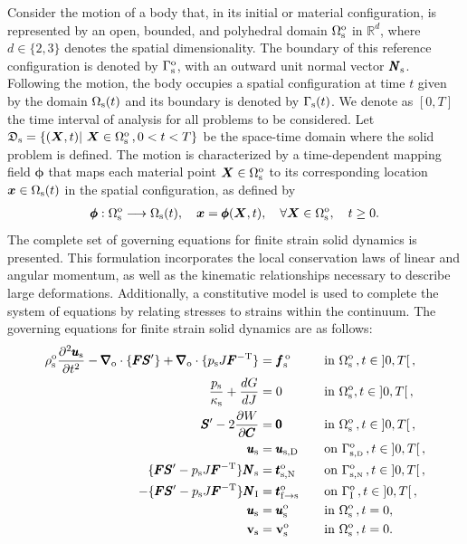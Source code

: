 \documentclass[11pt,english]{article}
\def\usolid{\pmb{u}_{\rm{s}}}                   %
\def\psolid{p_{\rm{s}}}                         %
\def\devPK{\pmb{S}^\prime}                      %
\def\X{\pmb{X}}                             %
\def\x{\pmb{x}}                             %
\def\motion{\pmb{\phi}}                     %
\def\F{\pmb{F}}                             %
\def\C{\pmb{C}}                             %
\def\invFtrans{\pmb{F}^{-\rm{T}}}           %
\def\dGdJ{\frac{dG}{dJ}}                    %
\def\dWdC{\frac{\partial W}{\partial \C}}   %
\def\vsolid{\vb{v}_{\rm{s}}}               %
\def\domainsolidreference{\Omega_{\rm{s}}^{\rm{o}}}  %
\def\domainsolid{\Omega_{\rm{s}}}                    %
\def\boundarysolid{\Gamma_{\rm{s}}}         %
\def\boundarysolidreference{\Gamma_{\rm{s}}^{\rm{o}}}         %
\def\boundarysolidDirichlet{\Gamma_{\rm{s,\scriptscriptstyle \rm{D}}}^{\rm{o}}} %
\def\boundarysolidNeumann{\Gamma_{\rm{s}, \scriptscriptstyle \rm{N}}^{\rm{o}}} %
\def\spacetimesoliddomain{\mathfrak{D}_{\rm{s}}}     %
\def\Normal{\pmb{N}_{\rm{s}}}                       %
\def\usolidDir{\pmb{u}_{\rm{s},\rm{D}}}                    %
\def\reftract{\pmb{t}_{\rm{s},\rm{N}}^{\rm{o}}}            %
\def\bodyfsolid{\pmb{f}_{\rm{s}}^{\,\rm{o}}}        %
\def\grad{\pmb{\nabla}_{\rm{o}}}        %
\def\div{\grad \cdot}                   %
\def\denssolid{\rho_{\rm{s}}^{\rm{o}}}  %
\def\kappasolid{\kappa_{\rm{s}}}        %
\def\X{\boldsymbol{X}}
\def\x{\boldsymbol{x}}
\def\boundaryFSIreference{\Gamma_{\rm{I}}^{\rm{o}}}
\def\FSItract{\pmb{t}_{\rm{f}\to{\rm{s}}}}
\def\FSItractref{\FSItract^{\rm{o}}}
\def\NormalFSI{\pmb{N}_{\rm{I}}}
\def\timeint{\left ] 0,T\right[}                         %
\def\dudt{\frac{\partial \usolid}{\partial t}}          %
\def\dudt2{\frac{\partial^2 \usolid}{\partial t^2}}     %
\begin{document}
Consider the motion of a body that, in its initial or material configuration, is represented by an open, bounded, and polyhedral domain \(\domainsolidreference\) in \(\mathbb{R}^d\), where \(d \in \lbrace 2, 3 \rbrace\) denotes the spatial dimensionality. The boundary of this reference configuration is denoted by \(\boundarysolidreference\), with an outward unit normal vector \(\Normal\). Following the motion, the body occupies a spatial configuration at time $t$ given by the domain \(\domainsolid (t)\) and its boundary is denoted by \(\boundarysolid (t) \). We denote as $[0,T]$ the time interval of analysis for all problems to be considered. Let $\spacetimesoliddomain=\left \lbrace (\X,t) \rvert ~\X \in \domainsolidreference\,, 0<t<T \right \rbrace$ be the space-time domain where the solid problem is defined. The motion is characterized by a time-dependent mapping field \(\motion\) that maps each material point \(\X \in \domainsolidreference\) to its corresponding location \(\x \in \domainsolid (t)\) in the spatial configuration, as defined by
 \begin{align*}
     \motion : \domainsolidreference \longrightarrow \domainsolid(t), \quad
     \x = \motion(\X,t), \quad \forall \X \in \domainsolidreference, \quad t \geq 0.
 \end{align*}
The complete set of governing equations for finite strain solid dynamics is presented. This formulation incorporates the local conservation laws of linear and angular momentum, as well as the kinematic relationships necessary to describe large deformations. Additionally, a constitutive model is used to complete the system of equations by relating stresses to strains within the continuum. The governing equations for finite strain solid dynamics are as follows:
\begin{align}
 \denssolid \dudt2 - \div \lbrace \F \devPK \rbrace + \div \lbrace \psolid J \invFtrans \rbrace &= \bodyfsolid \quad && \hbox{in}~\domainsolidreference\,, t \in \timeint, \label{eq:sol_conservation_linear_momentum} \\
 \frac{\psolid}{\kappasolid} + \dGdJ &= 0 \quad && \hbox{in}~\domainsolidreference, t \in \timeint, \label{eq:sol_constitutive_volumetric_law}\\
 \devPK - 2\dWdC &= \pmb{0} \quad && \hbox{in}~\domainsolidreference\,, t \in \timeint, \label{eq:sol_constitutive_deviatoric_law}\\
 \usolid &= \usolidDir \quad && \hbox{on}~\boundarysolidDirichlet\,, t \in \timeint,\label{eq:sol_Dirichlet} \\
 \lbrace \F \devPK - \psolid J \invFtrans \rbrace \Normal &= \reftract \quad && \hbox{on}~\boundarysolidNeumann\,, t \in \timeint, \label{eq:sol_tractions_neuman} \\
-  \lbrace \F \devPK - \psolid J \invFtrans \rbrace \NormalFSI &= \FSItractref \quad && \hbox{on}~\boundaryFSIreference\,, t \in \timeint, \label{eq:sol_tractions_FSI}\\
 \usolid &= \usolid^{\rm{o}} &&\hbox{in}~\domainsolidreference\,, t=0,\label{eq:sol_displacement_initial_condition} \\
    \vsolid &= \vsolid^{\rm{o}} &&\hbox{in}~\domainsolidreference\,, t=0.\label{eq:sol_velocity_initial_condition}
\end{align}
\end{document}
